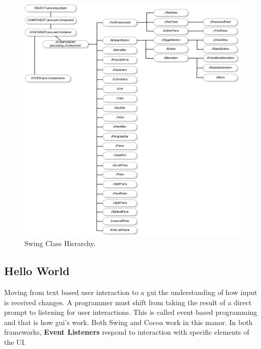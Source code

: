 \documentclass[a4paper,14pt]{article}
\begin{document}
\begin{figure}[H]
\centering
\includegraphics[scale=0.8]{Java1.png}
\caption{Swing Class Hierarchy. \protect{}}
\label{fig:swingHierarchy}
\end{figure}

%
%
%

\subsection{Hello World} %
\label{sub:hello_world}
Moving from text based user interaction to a \gls{gui} the understanding of how input is received changes. A programmer must shift from taking the result of a direct prompt to listening for user interactions. This is called event based programming and that is how \gls{gui}'s work. Both Swing and Cocoa work in this manor. In both frameworks, \textbf{Event Listeners} respond to interaction with specific elements of the UI.
\end{document}
